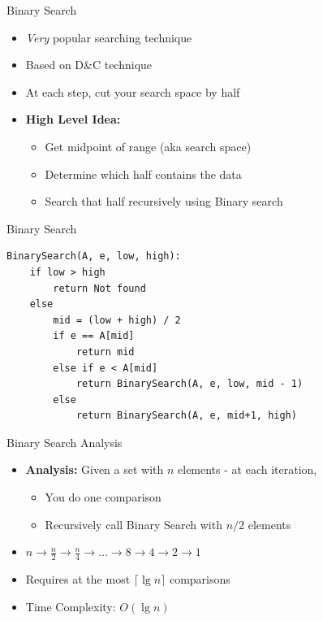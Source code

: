 \documentclass{beamer}
\begin{document}
\begin{frame}{Binary Search}
\begin{itemize}
\item {\em Very} popular searching technique
\item Based on D\&C technique
\item At each step, cut your search space by half
\item {\bf High Level Idea:}
\begin{itemize}
    \item Get midpoint of range (aka search space)
    \item Determine which half contains the data
    \item Search that half recursively using Binary search
\end{itemize}
\end{itemize}
\end{frame}



\begin{frame}[fragile]{Binary Search}
\begin{verbatim}
BinarySearch(A, e, low, high):
    if low > high
        return Not found
    else
        mid = (low + high) / 2
        if e == A[mid]
            return mid
        else if e < A[mid]
            return BinarySearch(A, e, low, mid - 1)
        else 
            return BinarySearch(A, e, mid+1, high)
\end{verbatim}
\end{frame}


\begin{frame}{Binary Search Analysis}
\begin{itemize}
\item {\bf Analysis:} Given a set with $n$ elements - at each iteration, 
\begin{itemize}
    \item You do one comparison
    \item Recursively call  Binary Search with $n/2$ elements 
\end{itemize}
\item $n \rightarrow \frac{n}{2} \rightarrow \frac{n}{4} \rightarrow \ldots \rightarrow 8 \rightarrow 4 \rightarrow 2 \rightarrow 1$
\pause
\item Requires at the most $\lceil \lg n \rceil$ comparisons
\item Time Complexity: $O(\lg n)$
\end{itemize}
\end{frame}
\end{document}
